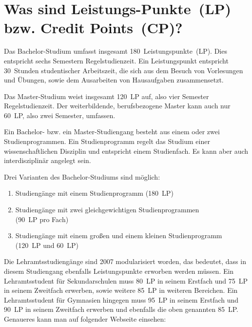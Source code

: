 
\section[Was sind Leistungs-Punkte?]{Was sind Leistungs-Punkte~(LP) bzw. Credit Points~(CP)?}
\label{creditpoints}

Das Bachelor-Studium umfasst insgesamt 180~Leistungspunkte~(LP).
Dies entspricht sechs Semestern Regelstudienzeit.
Ein Leistungspunkt entspricht 30~Stunden studentischer Arbeitszeit, die sich aus dem Besuch von Vorlesungen und Übungen, sowie dem Ausarbeiten von Hausaufgaben zusammensetzt.

Das Master-Studium weist insgesamt 120~LP auf, also vier Semester Regelstudienzeit.
Der weiterbildende, berufsbezogene Master kann auch nur 60~LP, also zwei Semester, umfassen.

Ein Bachelor- bzw. ein Master-Studiengang besteht aus einem oder zwei Studienprogrammen.
Ein Studienprogramm regelt das Studium einer wissenschaftlichen Disziplin und entspricht einem Studienfach.
Es kann aber auch interdisziplinär angelegt sein.

Drei Varianten des Bachelor-Studiums sind möglich:
\begin{enumerate}
    \item Studiengänge mit einem Studienprogramm (180~LP)
    \item Studiengänge mit zwei gleichgewichtigen Studienprogrammen\\
          (90~LP pro Fach)
    \item Studiengänge mit einem großen und einem kleinen Studienprogramm\\
          (120~LP und 60~LP)
\end{enumerate}

Die Lehramtsstudiengänge sind 2007 modularisiert worden, das bedeutet, dass in diesem Studiengang ebenfalls Leistungspunkte erworben werden müssen.
Ein Lehramtsstudent für Sekundarschulen muss 80~LP in seinem Erstfach und 75~LP in seinem Zweitfach erwerben, sowie weitere 85~LP in weiteren Bereichen.
Ein Lehramtsstudent für Gymnasien hingegen muss 95~LP in seinem Erstfach und 90~LP in seinem Zweitfach erwerben und ebenfalls die oben genannten 85~LP.
Genaueres kann man auf folgender Webseite einsehen:\\[1.0em]
